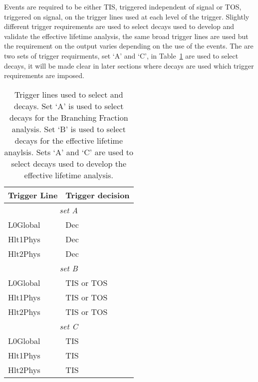 Events are required to be either TIS, triggered independent of signal or TOS, triggered on signal, on the trigger lines used at each level of the trigger.
Slightly different trigger requirements are used to select \bhh decays used to develop and validate the effective lifetime analysis, the same broad trigger lines are used but the requirement on the output varies depending on the use of the \bhh events. The are two sets of trigger requirments, set `A' and `C', in Table~\ref{tab:triggers} are used to select \bhh decays, it will be made clear in later sections where \bhh decays are used which trigger requirements are imposed. 

\begin{table}[ht]
\begin{center}
\begin{tabular}{ll}
\hline
Trigger Line	& Trigger decision \\ \hline
\multicolumn{2}{c}{{\it set A}} \\ \hline
L0Global	& Dec\\
Hlt1Phys	& Dec \\
Hlt2Phys	& Dec \\ \hline
\multicolumn{2}{c}{{\it set B}} \\ \hline
L0Global	& TIS or TOS \\
Hlt1Phys	& TIS or TOS \\
Hlt2Phys	& TIS or TOS \\ \hline
\multicolumn{2}{c}{{\it set C}} \\ \hline
L0Global	& TIS\\
Hlt1Phys	& TIS \\
Hlt2Phys	& TIS \\ \hline
\end{tabular}
\caption{Trigger lines used to select \bsmumu and \bhh decays. Set `A' is used to select decays for the Branching Fraction analysis. Set `B' is used to select \bsmumu decays for the effective lifetime anaylsis. Sets `A' and `C' are used to select \bhh decays used to develop the \bsmumu effective lifetime analysis.}
\label{tab:triggers}
\end{center}
\end{table}


